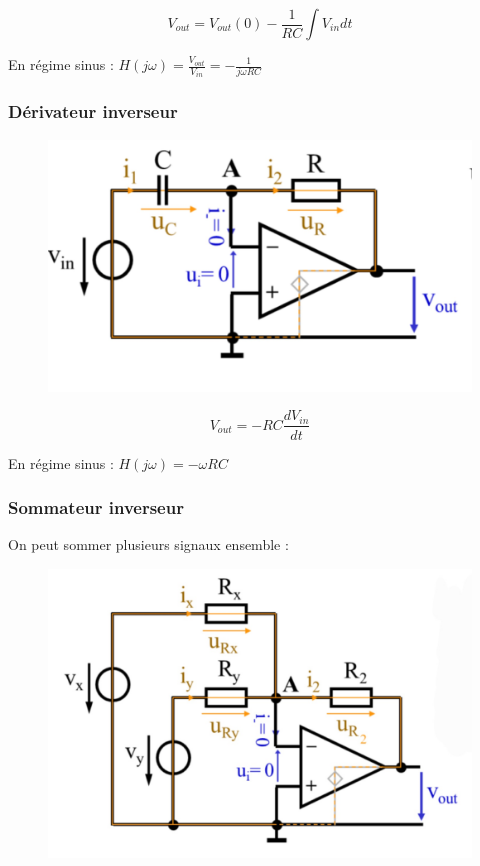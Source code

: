 \documentclass[../main.tex]{subfiles}
\begin{document}
\begin{equation}
    V_{out} = V_{out}(0) - \frac{1}{RC} \int V_{in}dt
\end{equation}

En régime sinus : $H(j\omega) = \frac{V_{out}}{V_{in}} = -\frac{1}{j\omega RC}$\\

\subsubsection{Dérivateur inverseur}

\begin{figure}[hbt!]
    \centering
    \includegraphics[width=.7\textwidth]{IMAGES/elec/IMG_0134.jpeg}
\end{figure}

\begin{equation}
    V_{out} = -RC \frac{dV_{in}}{dt}
\end{equation}

En régime sinus : $H(j\omega) = -\omega RC$\\

\subsubsection{Sommateur inverseur}

On peut sommer plusieurs signaux ensemble : \\

\begin{figure}[hbt!]
    \centering
    \includegraphics[width=.7\textwidth]{IMAGES/elec/IMG_0135.jpeg}
\end{figure}
\end{document}
